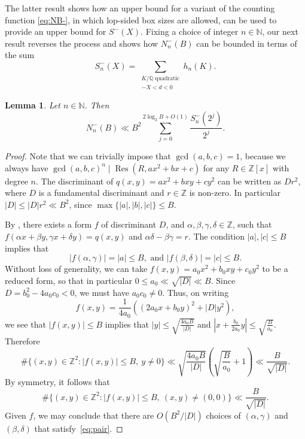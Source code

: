 \documentclass[reqno, 12pt, twoside]{amsart}
\numberwithin{equation}{section}
\DeclareMathOperator{\Res}{Res}
\newcommand{\Z}{\mathbb{Z}}
\newcommand{\QQ}{\mathbb{Q}}
\newcommand{\0}{\mathbf{0}}
\newcommand{\NN}{\mathbb{N}}
\newtheorem{lemma}[theorem]{Lemma}
\theoremstyle{definition}
\renewcommand{\leq}{\leqslant}
\begin{document}
The latter result shows how an upper bound for a variant of the counting function \eqref{eq:NB-},
in which  lop-sided box sizes are allowed, can be used to provide an upper bound for $S^-(X)$. 
Fixing a choice of integer $n\in \NN$, 
our next result reverses the process and shows how 
$N_n^-(B)$ can be bounded in terms of the sum 
$$
S_n^-(X)=
\sum_{
\substack{K/\QQ \text{ quadratic}\\
-X<d<0
}}  h_n(K).
$$

\begin{lemma}
Let $n\in \NN$. Then 
$$
N_n^-(B)\ll 
B^2 \sum_{j=0}^{2\log_2 B+O(1)}
 \frac{S_n^-(2^j)}{2^j}.
$$
\end{lemma}

\begin{proof}
Note that we can trivially impose that $\gcd(a,b,c)=1$, because we always have $\gcd(a,b,c)^n\mid \Res(R,ax^2+bx+c)$ for any $R\in\Z[x]$ with degree $n$. 
The discriminant of $q(x,y)=ax^2+bxy+cy^2$ can be written as $Dr^2$, where $D$ is a fundamental discriminant and $r\in\Z$ is non-zero. 
In particular $|D|\leq |D|r^2\ll B^2$, since $\max\{|a|,|b|,|c|\}\leq B$.

By \cite[Prop.~7.1]{Buell}, there exists a form $f$ of discriminant $D$, and $\alpha,\beta,\gamma,\delta \in\Z$, such that $f(\alpha x+\beta y,\gamma x+\delta y)=q(x,y)$ and $\alpha\delta-\beta\gamma=r$.
The condition $|a|,|c|\leq B$ implies that
\begin{equation}\label{eq:pair}
|f(\alpha ,\gamma )|=|a|\leq B, \text{ and }|f(\beta ,\delta )|=|c|\leq B.
\end{equation}
Without loss of generality, we can take $f(x,y)=a_0x^2+b_0xy+c_0y^2$ to be a reduced form, so that in particular $0\leq a_0\ll \sqrt{|D|}\ll B$. Since $D=b_0^2-4a_0c_0<0$, we must have $a_0c_0\neq0$. Thus, on writing 
$$
f(x,y)=\frac{1}{4a_0}\left((2a_0x+b_0y)^2+|D|y^2\right),
$$ 
we see that $|f(x ,y)|\leq B$ implies that $|y|\leq\sqrt{ \frac{4a_0B}{|D|}}$ and $|x+\frac{b_0}{2a_0}y|\leq \sqrt{\frac{B}{a_0}}$. Therefore
\[\#\{(x,y)\in\Z^2: |f(x,y)|\leq B,\ y\neq 0\}\ll \sqrt{ \frac{4a_0B}{|D|}}\left( \sqrt{\frac{B}{a_0}}+1\right)\ll \frac{B}{\sqrt{|D|}}.
\]
By symmetry, it follows that 
\[\#\{(x,y)\in\Z^2: |f(x,y)|\leq B,\ (x,y)\neq (0,0)\}\ll \frac{B}{\sqrt{|D|}}.\]
Given $f$, we may conclude that there are $O(B^2/|D|)$ 
choices of  $(\alpha ,\gamma )$ and $(\beta ,\delta )$ that satisfy~\eqref{eq:pair}. 



\end{proof}
\end{document}
